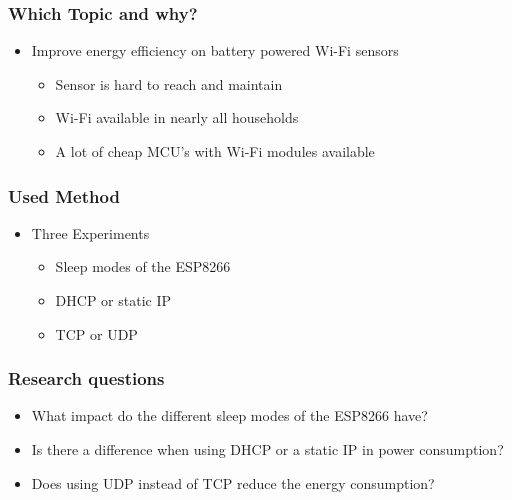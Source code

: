 \begin{frame}
    \frametitle{Which Topic and why?}

    \begin{itemize}

        \item Improve energy efficiency on battery powered Wi-Fi sensors
              \begin{itemize}
                  \item Sensor is hard to reach and maintain
                  \item Wi-Fi available in nearly all households
                  \item A lot of cheap MCU's with Wi-Fi modules available
              \end{itemize}
    \end{itemize}
\end{frame}

\begin{frame}
    \frametitle{Used Method}

    \begin{itemize}
        \item Three Experiments
              \begin{itemize}
                  \item Sleep modes of the ESP8266
                  \item DHCP or static IP
                  \item TCP or UDP
              \end{itemize}
    \end{itemize}
\end{frame}


\begin{frame}
    \frametitle{Research questions}

    \begin{itemize}
        \item What impact do the different sleep modes of the ESP8266 have?
        \item Is there a difference when using DHCP or a static IP in power consumption?
        \item Does using UDP instead of TCP reduce the energy consumption?
    \end{itemize}
\end{frame}
